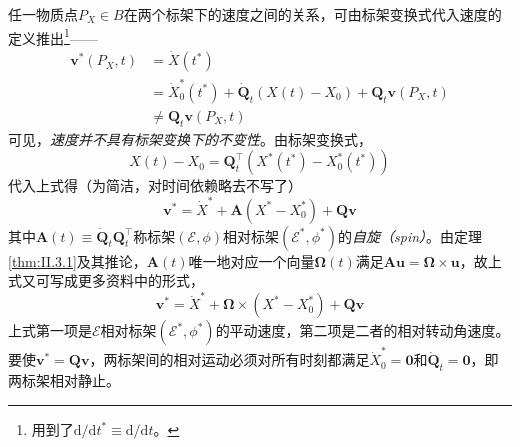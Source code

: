 \documentclass[main.tex]{subfiles}
\begin{document}
任一物质点$P_X\in B$在两个标架下的速度之间的关系，可由标架变换式代入速度的定义推出\footnote{用到了$\mathrm{d}/\mathrm{d}t^*\equiv\mathrm{d}/\mathrm{d}t$。}——
\begin{align*}
    \mathbf{v}^*\left(P_X,t\right) & =\dot{X}\left(t^*\right)                                                                                                 \\
                                   & =\dot{X}_0^*\left(t^*\right)+\dot{\mathbf{Q}}_t\left(X\left(t\right)-X_0\right)+\mathbf{Q}_t\mathbf{v}\left(P_X,t\right) \\
                                   & \neq\mathbf{Q}_t\mathbf{v}\left(P_X,t\right)
\end{align*}
可见，\emph{速度并不具有标架变换下的不变性}。由标架变换式，
\[X\left(t\right)-X_0=\mathbf{Q}_t^\intercal\left(X^*\left(t^*\right)-X_0^*\left(t^*\right)\right)\]
代入上式得（为简洁，对时间依赖略去不写了）
\[\mathbf{v}^*=\dot{X}^*+\mathbf{A}\left(X^*-X_0^*\right)+\mathbf{Qv}\]
其中$\mathbf{A}\left(t\right)\equiv\dot{\mathbf{Q}}_t\mathbf{Q}_t^\intercal$称标架$\left(\mathcal{E},\phi\right)$相对标架$\left(\mathcal{E}^*,\phi^*\right)$的\emph{自旋（spin）}。由定理\ref{thm:II.3.1}及其推论，$\mathbf{A}\left(t\right)$唯一地对应一个向量$\mathbf{\Omega}\left(t\right)$满足$\mathbf{Au}=\mathbf{\Omega}\times\mathbf{u}$，故上式又可写成更多资料中的形式，
\[\mathbf{v}^*=\dot{X}^*+\boldsymbol{\Omega}\times\left(X^*-X_0^*\right)+\mathbf{Qv}\]
上式第一项是$\mathcal{E}$相对标架$\left(\mathcal{E}^*,\phi^*\right)$的平动速度，第二项是二者的相对转动角速度。要使$\mathbf{v}^*=\mathbf{Qv}$，两标架间的相对运动必须对所有时刻都满足$\dot{X}_0^*=\mathbf{0}$和$\dot{\mathbf{Q}}_t=\mathbf{0}$，即两标架相对静止。
\end{document}
